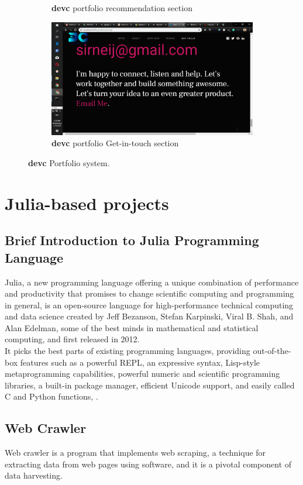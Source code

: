 \begin{itemize}
\begin{figure}[!htbp]
\begin{subfigure}[b]{0.45\textwidth}
			\caption{\textbf{devc} portfolio recommendation section}
		\end{subfigure}
		\medskip
		\begin{subfigure}[b]{0.5\textwidth}
			\centering
			\includegraphics[width=\linewidth]{./devcportgetintouch}
			\caption{\textbf{devc} portfolio Get-in-touch section}
		\end{subfigure}
		\caption{\textbf{devc} Portfolio system.}
	\end{figure}
\end{itemize}
\section{Julia-based projects}
\subsection{Brief Introduction to Julia Programming Language}
Julia, a new programming language offering a unique combination of performance and productivity that promises to change scientific computing and programming in general, is an open-source language for high-performance technical computing and data science created by Jeff Bezanson, Stefan Karpinski, Viral B. Shah, and Alan Edelman, some of the best minds in mathematical and statistical computing, and first released in 2012.\\ 

It picks the best parts of existing programming languages, providing out-of-the-box features such as a powerful \ac{REPL}, an expressive syntax, Lisp-style metaprogramming capabilities, powerful numeric and scientific programming libraries, a built-in package manager, efficient Unicode support, and easily called C and Python functions, \citet{Salceanu:2018}.
\subsection{Web Crawler}
Web crawler is a program that implements web scraping, a technique for extracting data from web pages using software, and it
is a pivotal component of data harvesting.\\


